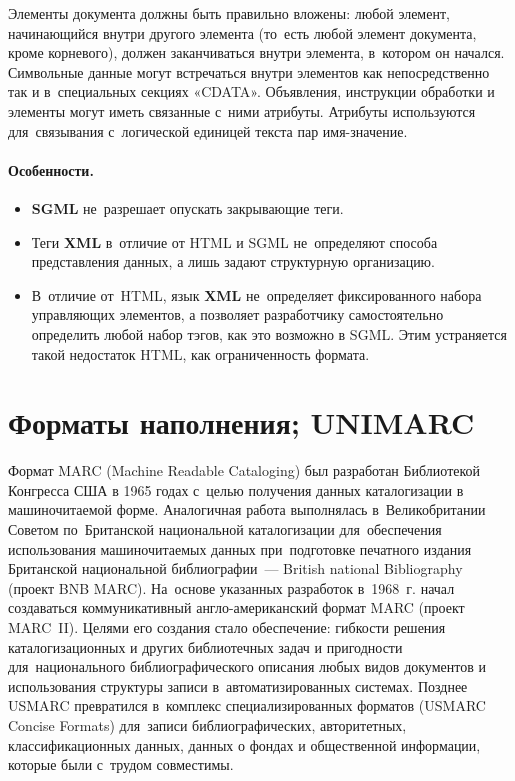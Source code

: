 \documentclass[12pt]{article}
\theoremstyle{definition}
\theoremstyle{remark}
\numberwithin{equation}{section}
\begin{document}
Элементы документа должны быть правильно вложены: любой элемент,
начинающийся внутри другого элемента (то~есть любой элемент документа,
кроме корневого), должен заканчиваться внутри элемента, в~котором
он начался. Символьные данные могут встречаться внутри элементов
как непосредственно так и в~специальных секциях «CDATA». Объявления,
инструкции обработки и элементы могут иметь связанные с~ними атрибуты.
Атрибуты используются для~связывания с~логической единицей текста
пар имя-значение.

\paragraph{Особенности.}
\begin{itemize}
	\item \textbf{SGML} не~разрешает опускать закрывающие теги.
	\item Теги \textbf{XML} в~отличие от HTML и SGML не~определяют
    способа представления данных, а лишь задают структурную организацию.
	\item В~отличие от~HTML, язык \textbf{XML} не~определяет
    фиксированного набора управляющих элементов, а позволяет
    разработчику самостоятельно определить любой набор тэгов, как это
    возможно в SGML. Этим устраняется такой недостаток HTML, как
    ограниченность формата.
\end{itemize}

\section{Форматы наполнения; UNIMARC}
Формат MARC (Machine Readable Cataloging) был разработан Библиотекой
Конгресса США в 1965 годах с~целью получения данных
каталогизации в машиночитаемой форме. Аналогичная работа выполнялась
в~Великобритании Советом по~Британской национальной каталогизации
для~обеспечения использования машиночитаемых данных при~подготовке
печатного издания Британской национальной библиографии~--- British
national Bibliography (проект BNB MARC). На~основе указанных разработок
в~1968~г. начал создаваться коммуникативный англо\nobreakdash-американский
формат MARC (проект MARC~II). Целями его создания стало обеспечение:
гибкости решения каталогизационных и других библиотечных задач и пригодности
для~национального библиографического описания любых видов документов
и использования структуры записи в~автоматизированных системах.
Позднее USMARC превратился в~комплекс специализированных форматов
(USMARC Concise Formats) для~записи библиографических, авторитетных,
классификационных данных, данных о фондах и общественной информации,
которые были с~трудом совместимы.
\end{document}
